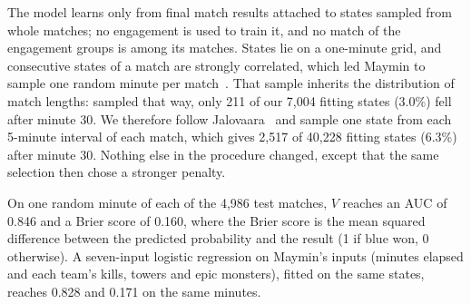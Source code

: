 The model learns only from final match results attached to states sampled from whole matches; no
engagement is used to train it, and no match of the engagement groups is among its matches. States lie on
a one-minute grid, and consecutive states of a match are strongly correlated, which led Maymin to sample
one random minute per match~\cite{maymin2021smart}. That sample inherits the distribution of match
lengths: sampled that way, only 211 of our 7,004 fitting states (3.0\%) fell after minute 30. We
therefore follow Jalovaara~\cite{jalovaara2024win} and sample one state from each 5-minute interval of
each match, which gives 2,517 of 40,228 fitting states (6.3\%) after minute 30. Nothing else in the
procedure changed, except that the same selection then chose a stronger penalty.

On one random minute of each of the 4,986 test matches, $V$ reaches an AUC of 0.846 and a Brier score of
0.160, where the Brier score is the mean squared difference between the predicted probability and the
result (1 if blue won, 0 otherwise). A seven-input logistic regression on Maymin's inputs (minutes
elapsed and each team's kills, towers and epic monsters), fitted on the same states, reaches 0.828 and
0.171 on the same minutes.

